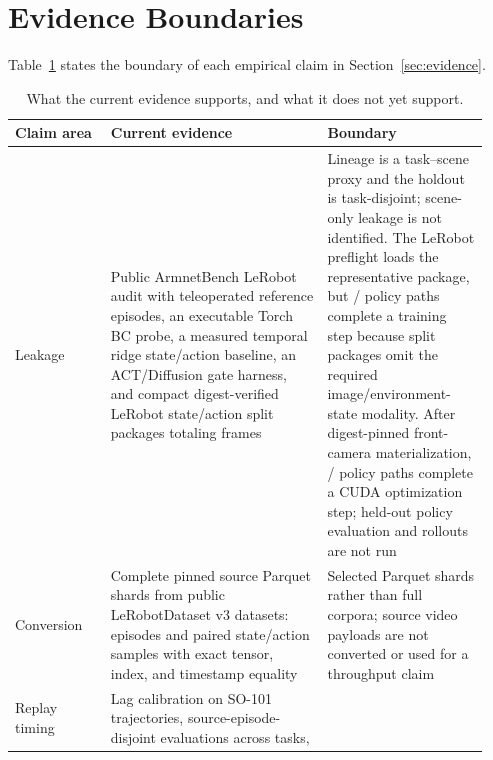 \clearpage
\appendix

\section{Evidence Boundaries}
\label{app:boundaries}

Table~\ref{tab:evidence-boundaries} states the boundary of each empirical claim in
Section~\ref{sec:evidence}.

\begin{table}[!htbp]
\centering
\footnotesize
\renewcommand{\arraystretch}{0.92}
\caption{What the current evidence supports, and what it does not yet support.}
\label{tab:evidence-boundaries}
\begin{tabular}{@{}>{\raggedright\arraybackslash}p{0.19\linewidth}
                >{\raggedright\arraybackslash}p{0.43\linewidth}
                >{\raggedright\arraybackslash}p{0.32\linewidth}@{}}
\toprule
Claim area & Current evidence & Boundary \\
\midrule
Leakage & Public ArmnetBench LeRobot audit with \ExpSceneEpisodeCount{} teleoperated reference episodes, an executable
Torch BC probe, a measured temporal ridge state/action baseline, an ACT/Diffusion gate harness, and
\ExpPolicySplitPackageCount{} compact digest-verified LeRobot state/action split packages totaling
\ExpPolicySplitFrameCount{} frames &
Lineage is a task--scene proxy and the holdout is task-disjoint; scene-only leakage is not
identified. The LeRobot \ExpPolicyCompatibilityLeRobotVersion{} preflight loads the representative
package, but \ExpPolicyCompatibilityTrainingStepCount{}/\ExpPolicyCompatibilityProbeCount{} policy
paths complete a training step because split packages omit the required image/environment-state
modality. After digest-pinned front-camera materialization,
\ExpPolicyVisionTrainingStepCount{}/\ExpPolicyVisionProbeCount{} policy paths complete a CUDA
optimization step; held-out policy evaluation and rollouts are not run \\
Conversion & Complete pinned source Parquet shards from \ExpConversionScaleDatasetCount{} public
LeRobotDataset v3 datasets: \ExpConversionScaleEpisodeCount{} episodes and
\ExpConversionScaleRowCount{} paired state/action samples with exact tensor, index, and timestamp
equality & Selected Parquet shards rather than full corpora; source video payloads are not converted
or used for a throughput claim \\
Replay timing & Lag calibration on \ExpTimingCalibrationEpisodes{} SO-101 trajectories,
\ExpTimingHeldoutEpisodes{} source-episode-disjoint evaluations across \ExpTimingTaskCount{} tasks,

\end{tabular}
\end{table}
